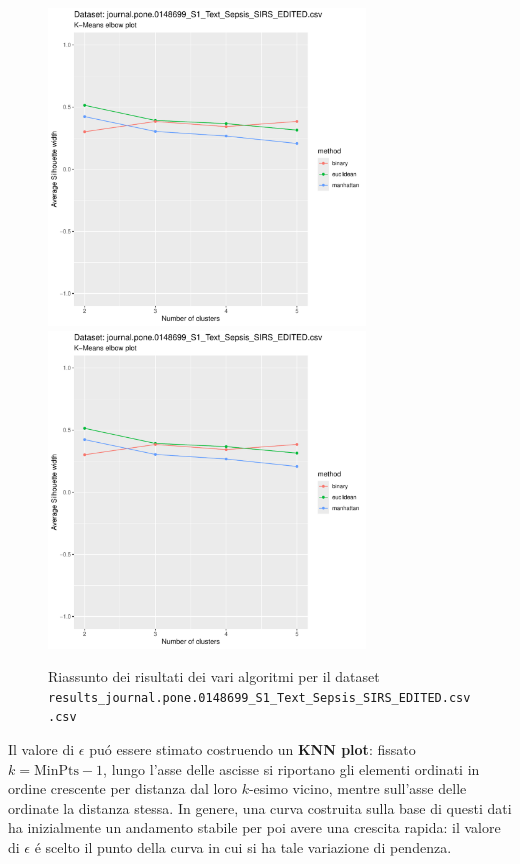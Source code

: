 \documentclass[12pt]{report}
\begin{document}
			\begin{figure}[h]
				\centering
				\includegraphics[width = 0.75\textwidth, height = 0.45\textheight, page = 9]{
					results/results_journal.pone.0148699_S1_Text_Sepsis_SIRS_EDITED.csv.pdf
				}
				\includegraphics[width = 0.75\textwidth, height = 0.45\textheight, page = 10]{
					results/results_journal.pone.0148699_S1_Text_Sepsis_SIRS_EDITED.csv.pdf
				}
				\caption{Riassunto dei risultati dei vari algoritmi per il dataset
				\texttt{results\_journal.pone.0148699\_S1\_Text\_Sepsis\_SIRS\_EDITED.csv.csv}}
				\label{fig:comp5}
			\end{figure}

			Il valore di $\epsilon$ puó essere stimato costruendo un \textbf{KNN
			plot}: fissato $k = \textrm{MinPts} - 1$, lungo l'asse delle ascisse
			si riportano gli elementi ordinati in ordine crescente per distanza
			dal loro $k$-esimo vicino, mentre sull'asse delle ordinate la distanza
			stessa. In genere, una curva costruita sulla base di questi dati ha
			inizialmente un andamento stabile per poi avere una crescita rapida:
			il valore di $\epsilon$ é scelto il punto della curva in cui si ha
			tale variazione di pendenza.
\end{document}
